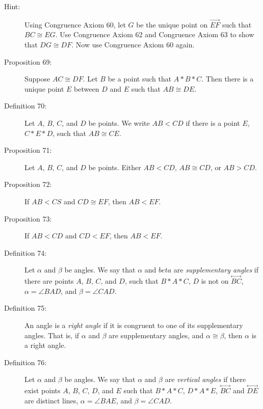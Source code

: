 \documentclass{article}
\newcommand{\linethrough}[1]{\stackrel{\longleftrightarrow}{#1} }
\newcommand{\ray}[1]{\stackrel{\longrightarrow}{#1} }
\begin{document}
\begin{description}
\item[Hint:] Using Congruence Axiom 60, let $G$ be the unique point on $\ray{EF}$ such that $BC \cong EG$. Use Congruence Axiom 62 and Congruence Axiom 63 to show that $DG \cong DF$. Now use Congruence Axiom 60 again.

\item[Proposition 69:] Suppose $AC \cong DF$. Let $B$ be a point such that $A*B*C$. Then there is a unique point $E$ between $D$ and $E$ such that $AB \cong DE$.

\item[Definition 70:] Let $A$, $B$, $C$, and $D$ be points. We write $AB<CD$ if there is a point $E$, $C*E*D$, such that $AB \cong CE$.

\item[Proposition 71:] Let $A$, $B$, $C$, and $D$ be points. Either $AB<CD$, $AB\cong CD$, or $AB>CD$.

\item[Proposition 72:] If $AB<CS$ and $CD\cong EF$, then $AB<EF$.

\item[Proposition 73:] If $AB<CD$ and $CD<EF$, then $AB<EF$.

\item[Definition 74:] Let $\alpha$ and $\beta$ be angles. We say that $\alpha$ and $beta$ are \emph{supplementary angles} if there are points $A$, $B$, $C$, and $D$, such that $B*A*C$, $D$ is not on $\linethrough{BC}$, $\alpha = \angle BAD$, and $\beta = \angle CAD$.

\item[Definition 75:] An angle is a \emph{right angle} if it is congruent to one of its supplementary angles. That is, if $\alpha$ and $\beta$ are supplementary angles, and $\alpha \cong \beta$, then $\alpha$ is a right angle.

\item[Definition 76:] Let $\alpha$ and $\beta$ be angles. We say that $\alpha$ and $\beta$ are \emph{vertical angles} if there exist points $A$, $B$, $C$, $D$, and $E$ such that $B*A*C$, $D*A*E$, $\linethrough{BC}$ and $\linethrough{DE}$ are distinct lines, $\alpha = \angle BAE$, and $\beta = \angle CAD$.

\end{description}
\end{document}
